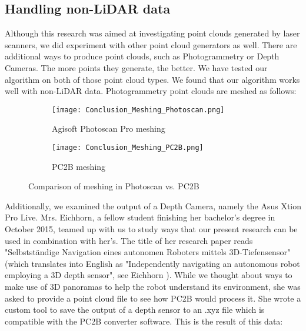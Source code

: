 \subsection{Handling non-LiDAR data}

Although this research was aimed at investigating point clouds generated by laser scanners, we did experiment with other point cloud generators as well. There are additional ways to produce point clouds, such as Photogrammetry or Depth Cameras. The more points they generate, the better. We have tested our algorithm on both of those point cloud types. We found that our algorithm works well with non-LiDAR data. Photogrammetry point clouds are meshed as follows:

\begin{figure}[h]
	\centering
	\begin{subfigure}[b]{0.49\textwidth}
		\centering
		\texttt{[image: Conclusion\_Meshing\_Photoscan.png]}
		\caption{Agisoft Photoscan Pro meshing}
		\label{fig:conclusion_meshing_photoscan}
	\end{subfigure}
	\hfill
	\begin{subfigure}[b]{0.49\textwidth}
		\centering
		\texttt{[image: Conclusion\_Meshing\_PC2B.png]}
		\caption{PC2B meshing}
		\label{fig:conclusion_meshing_pc2b}
	\end{subfigure}
	\caption{Comparison of meshing in Photoscan vs. PC2B}
	\label{fig:conclusion_meshing_photoscan_vs_pc2b}
\end{figure}

\pagebreak

Additionally, we examined the output of a Depth Camera, namely the Asus Xtion Pro Live. Mrs. Eichhorn, a fellow student finishing her bachelor's degree in October 2015, teamed up with us to study ways that our present research can be used in combination with her's. The title of her research paper reads "Selbstständige Navigation eines autonomen Roboters mittels 3D-Tiefensensor" (which translates into English as "Independently navigating an autonomous robot employing a 3D depth sensor", see Eichhorn \parencite{anja_eichhorn}). While we thought about ways to make use of 3D panoramas to help the robot understand its environment, she was asked to provide a point cloud file to see how PC2B would process it. She wrote a custom tool to save the output of a depth sensor to an .xyz file which is compatible with the PC2B converter software. This is the result of this data:

